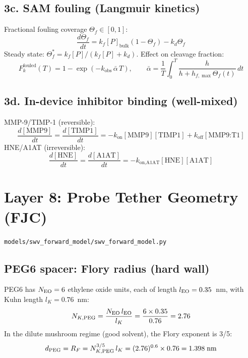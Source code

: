 \documentclass[10pt,a4paper]{article}
\numberwithin{equation}{section}
\newcommand{\file}[1]{\texttt{\small #1}}
\begin{document}
\subsection{3c. SAM fouling (Langmuir kinetics)}

Fractional fouling coverage $\Theta_f \in [0,1]$:
\begin{equation}
  \frac{d\Theta_f}{dt} = k_f[P]_{\text{bulk}}(1-\Theta_f) - k_d\Theta_f
\end{equation}
Steady state: $\Theta_f^* = k_f[P]/(k_f[P]+k_d)$. Effect on cleavage fraction:
\begin{equation}
  F_k^{\text{fouled}}(T) = 1 - \exp\!\left(-k_{\text{obs}}\,\bar{\alpha}\,T\right),
  \qquad
  \bar{\alpha} = \frac{1}{T}\int_0^T\!\frac{h}{h+h_{f,\max}\Theta_f(t)}\,dt
\end{equation}

\subsection{3d. In-device inhibitor binding (well-mixed)}

MMP-9/TIMP-1 (reversible):
\begin{equation}
  \frac{d[\text{MMP9}]}{dt} = \frac{d[\text{TIMP1}]}{dt}
  = -k_{\text{on}}[\text{MMP9}][\text{TIMP1}] + k_{\text{off}}[\text{MMP9:T1}]
\end{equation}
HNE/A1AT (irreversible):
\begin{equation}
  \frac{d[\text{HNE}]}{dt} = \frac{d[\text{A1AT}]}{dt}
  = -k_{\text{on,A1AT}}[\text{HNE}][\text{A1AT}]
\end{equation}

\section{Layer 8: Probe Tether Geometry (FJC)}
\file{models/swv\_forward\_model/swv\_forward\_model.py}

\subsection{PEG6 spacer: Flory radius (hard wall)}

PEG6 has $N_{\rm EO}=6$ ethylene oxide units, each of length $l_{\rm EO}=0.35$~nm,
with Kuhn length $l_K = 0.76$~nm:
\begin{equation}
  N_{K,\text{PEG}} = \frac{N_{\rm EO}\,l_{\rm EO}}{l_K} = \frac{6\times0.35}{0.76} = 2.76
\end{equation}
In the dilute mushroom regime (good solvent), the Flory exponent is 3/5:
\begin{equation}
  d_{\rm PEG} = R_F = N_{K,\text{PEG}}^{3/5}\,l_K = (2.76)^{0.6}\times0.76 = 1.398\;\text{nm}
\end{equation}
\end{document}
